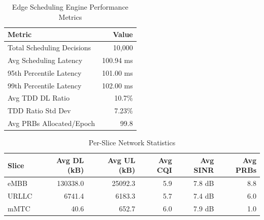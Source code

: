 
\begin{table}[h]
\centering
\caption{Edge Scheduling Engine Performance Metrics}
\label{tab:performance}
\begin{tabular}{|l|r|}
\hline
\textbf{Metric} & \textbf{Value} \\
\hline
Total Scheduling Decisions & 10,000 \\
Avg Scheduling Latency & 100.94 ms \\
95th Percentile Latency & 101.00 ms \\
99th Percentile Latency & 102.00 ms \\
Avg TDD DL Ratio & 10.7\% \\
TDD Ratio Std Dev & 7.23\% \\
Avg PRBs Allocated/Epoch & 99.8 \\
\hline
\end{tabular}
\end{table}


\begin{table}[h]
\centering
\caption{Per-Slice Network Statistics}
\label{tab:slice_stats}
\begin{tabular}{|l|r|r|r|r|r|}
\hline
\textbf{Slice} & \textbf{Avg DL (kB)} & \textbf{Avg UL (kB)} & \textbf{Avg CQI} & \textbf{Avg SINR} & \textbf{Avg PRBs} \\
\hline
eMBB & 130338.0 & 25092.3 & 5.9 & 7.8 dB & 8.8 \\
URLLC & 6741.4 & 6183.3 & 5.7 & 7.4 dB & 6.0 \\
mMTC & 40.6 & 652.7 & 6.0 & 7.9 dB & 1.0 \\
\hline
\end{tabular}
\end{table}
